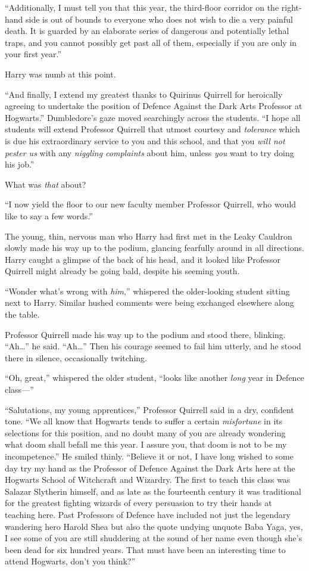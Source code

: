 “Additionally, I must tell you that this year, the third-floor corridor on the right-hand side is out of bounds to everyone who does not wish to die a very painful death. It is guarded by an elaborate series of dangerous and potentially lethal traps, and you cannot possibly get past all of them, especially if you are only in your first year.”

Harry was numb at this point.

“And finally, I extend my greatest thanks to Quirinus Quirrell for heroically agreeing to undertake the position of Defence Against the Dark Arts Professor at Hogwarts.” Dumbledore’s gaze moved searchingly across the students. “I hope all students will extend Professor Quirrell that utmost courtesy and \emph{tolerance} which is due his extraordinary service to you and this school, and that you \emph{will not pester us} with any \emph{niggling complaints} about him, unless \emph{you} want to try doing his job.”

What was \emph{that} about?

“I now yield the floor to our new faculty member Professor Quirrell, who would like to say a few words.”

The young, thin, nervous man who Harry had first met in the Leaky Cauldron slowly made his way up to the podium, glancing fearfully around in all directions. Harry caught a glimpse of the back of his head, and it looked like Professor Quirrell might already be going bald, despite his seeming youth.

“Wonder what’s wrong with \emph{him},” whispered the older-looking student sitting next to Harry. Similar hushed comments were being exchanged elsewhere along the table.

Professor Quirrell made his way up to the podium and stood there, blinking. “Ah…” he said. “Ah…” Then his courage seemed to fail him utterly, and he stood there in silence, occasionally twitching.

“Oh, great,” whispered the older student, “looks like another \emph{long} year in Defence class—”

“Salutations, my young apprentices,” Professor Quirrell said in a dry, confident tone. “We all know that Hogwarts tends to suffer a certain \emph{misfortune} in its selections for this position, and no doubt many of you are already wondering what doom shall befall me this year. I assure you, that doom is not to be my incompetence.” He smiled thinly. “Believe it or not, I have long wished to some day try my hand as the Professor of Defence Against the Dark Arts here at the Hogwarts School of Witchcraft and Wizardry. The first to teach this class was Salazar Slytherin himself, and as late as the fourteenth century it was traditional for the greatest fighting wizards of every persuasion to try their hands at teaching here. Past Professors of Defence have included not just the legendary wandering hero Harold Shea but also the quote undying unquote Baba Yaga, yes, I see some of you are still shuddering at the sound of her name even though she’s been dead for six hundred years. That must have been an interesting time to attend Hogwarts, don’t you think?”

